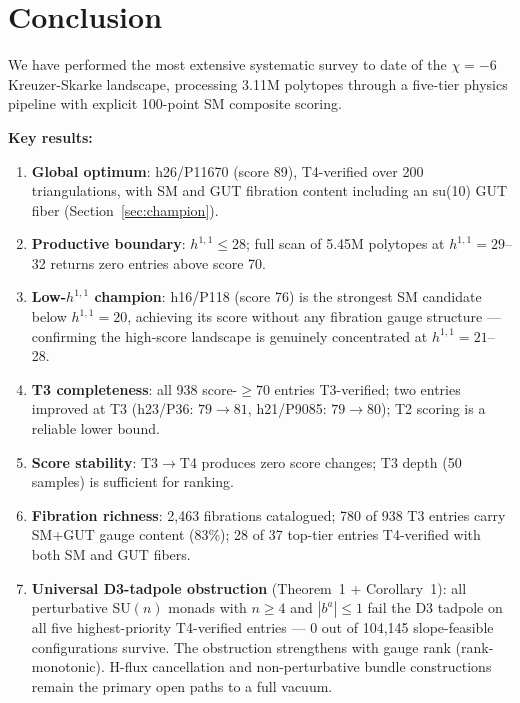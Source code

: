 \documentclass[11pt,a4paper]{article}
\begin{document}
\section{Conclusion}
\label{sec:conclusion}

We have performed the most extensive systematic survey to date
of the $\chi=-6$ Kreuzer-Skarke landscape, processing 3.11M
polytopes through a five-tier physics pipeline with explicit
100-point SM composite scoring.

\textbf{Key results:}
\begin{enumerate}[noitemsep]
  \item \textbf{Global optimum}: h26/P11670 (score 89),
    T4-verified over 200 triangulations, with SM and GUT fibration
    content including an su(10) GUT fiber (Section~\ref{sec:champion}).
  \item \textbf{Productive boundary}: $h^{1,1} \leq 28$;
    full scan of 5.45M polytopes at $h^{1,1}=29$--32 returns
    zero entries above score 70.
  \item \textbf{Low-$h^{1,1}$ champion}: h16/P118 (score 76)
    is the strongest SM candidate below $h^{1,1}=20$, achieving
    its score without any fibration gauge structure --- confirming
    the high-score landscape is genuinely concentrated at
    $h^{1,1}=21$--28.
  \item \textbf{T3 completeness}: all 938 score-$\geq 70$ entries
    T3-verified; two entries improved at T3 (h23/P36: $79\to 81$,
    h21/P9085: $79\to 80$); T2 scoring is a reliable lower bound.
  \item \textbf{Score stability}: T3$\to$T4 produces zero score
    changes; T3 depth (50 samples) is sufficient for ranking.
  \item \textbf{Fibration richness}: 2,463 fibrations catalogued;
    780 of 938 T3 entries carry SM+GUT gauge content (83\%);
    28 of 37 top-tier entries T4-verified with both SM and GUT fibers.
  \item \textbf{Universal D3-tadpole obstruction} (Theorem~1 +
    Corollary~1): all perturbative SU$(n)$ monads with $n\geq 4$
    and $|b^a|\leq 1$ fail the D3 tadpole on all five
    highest-priority T4-verified entries --- 0 out of 104{,}145
    slope-feasible configurations survive.
    The obstruction strengthens with gauge rank (rank-monotonic).
    H-flux cancellation and non-perturbative bundle constructions
    remain the primary open paths to a full vacuum.
\end{enumerate}
\end{document}
